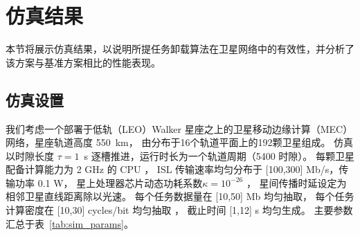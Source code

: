 \documentclass[a4paper,11pt]{article}
\begin{document}
\section{仿真结果}
\label{sec:simulation}
本节将展示仿真结果，以说明所提任务卸载算法在卫星网络中的有效性，并分析了该方案与基准方案相比的性能表现。
\subsection{仿真设置}
\label{subsec:sim_setup}


我们考虑一个部署于低轨（LEO）Walker 星座之上的卫星移动边缘计算（MEC）网络，星座轨道高度 550~km，
由分布于16个轨道平面上的192颗卫星组成。
仿真以时隙长度 $\tau=1$~s
逐槽推进，运行时长为一个轨道周期（5400 时隙）。
每颗卫星配备计算能力为 2 GHz 的 CPU \cite{zhang2024mhspo}，
ISL 传输速率均匀分布于 [100,300] Mb/s，传输功率 0.1 W，
星上处理器芯片动态功耗系数$\kappa=10^{-26}$ \cite{zhang2024mhspo}，
星间传播时延设定为相邻卫星直线距离除以光速。
每个任务数据量在 [10,50] Mb 均匀抽取，
每个任务计算密度在 [10,30] cycles/bit 均匀抽取 \cite{zhang2024mhspo}，
截止时间 [1,12] s 均匀生成。
主要参数汇总于表~\ref{tab:sim_params}。
\end{document}

